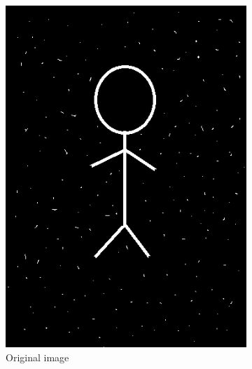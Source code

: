 \documentclass[a4paper]{article}
\begin{document}
\begin{figure}[htp]
\centering
\begin{subfigure}{.33\textwidth}
  \centering
  \includegraphics[width=.9\linewidth]{Image1.png}
  \caption{Original image}
  \label{fig:sub1}
\end{subfigure}%
\begin{subfigure}{.33\textwidth}
  \centering

\end{subfigure}
\end{figure}
\end{document}
